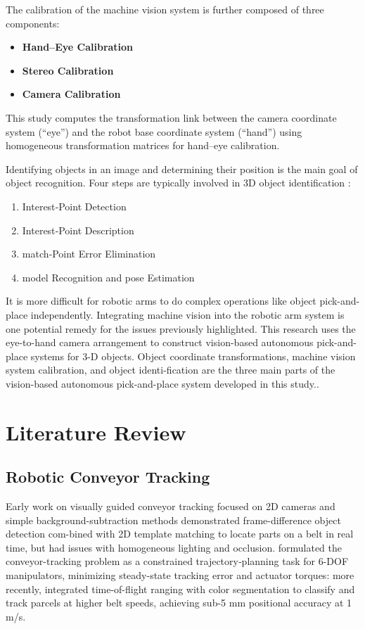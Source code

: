 \documentclass[12pt]{article}
\begin{document}
The calibration of the machine vision system is further composed of three components\cite{ref12}:
\begin{itemize}
  \item \textbf{Hand–Eye Calibration}
  \item \textbf{Stereo Calibration}
  \item \textbf{Camera Calibration}
\end{itemize}

This study computes the transformation link between the camera coordinate system (``eye'') and the robot base coordinate system (``hand'') using homogeneous transformation matrices for hand–eye calibration\cite{ref12}.

Identifying objects in an image and determining their position is the main goal of object recognition. Four steps are typically involved in 3D object identification \cite{ref12}:
\begin{enumerate}
  \item Interest‑Point Detection 
  \item Interest‑Point Description 
  \item match‑Point Error Elimination 
  \item model Recognition and pose Estimation 
\end{enumerate}
It is more difficult for robotic arms to do complex operations like object pick-and-place independently.  Integrating machine vision into the robotic arm system is one potential remedy for the issues previously highlighted. This research uses the eye-to-hand camera arrangement to construct vision-based autonomous pick-and-place systems for 3-D objects. Object coordinate transformations, machine vision system calibration, and object identi-fication are the three main parts of the vision-based autonomous pick-and-place system developed in this study.\cite{ref12}.
\newpage

\section{Literature Review}
\subsection{Robotic Conveyor Tracking}
Early work on visually guided conveyor tracking focused on 2D cameras and simple background-subtraction methods\cite{ref12} demonstrated frame-difference object detection com-bined with 2D template matching to locate parts on a belt in real time, but had issues with homogeneous lighting and occlusion.\cite{ref14} formulated the conveyor-tracking problem as a constrained trajectory‐planning task for 6-DOF manipulators, minimizing steady-state tracking error and actuator torques: more recently,\cite{ref9} integrated time-of-flight ranging with color segmentation to classify and track parcels at higher belt speeds, achieving sub-5 mm positional accuracy at 1 m/s.\\
\end{document}
